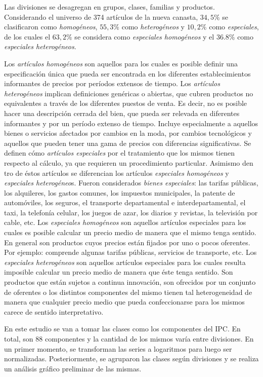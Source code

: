 \documentclass[12pt]{article}
\begin{document}
Las divisiones se desagregan en grupos, clases, familias y productos. Considerando el universo de 374 artículos de la nueva canasta, $34,5\%$ se clasificaron como \textit{homogéneos}, $55,3\%$ como \textit{heterogéneos} y $10,2\%$ como \textit{especiales}, de los cuales el $63,2\%$ se considera como \textit{especiales homogéneos} y el $36.8\%$ como \textit{especiales heterogéneos}.

Los \textit{artículos homogéneos} son aquellos para los cuales es posible definir una especificación única que pueda ser encontrada en los diferentes establecimientos informantes de precios por períodos extensos de tiempo. Los \textit{artículos heterogéneos} implican definiciones genéricas o abiertas, que cubren productos no equivalentes a través de los diferentes puestos de venta. Es decir, no es posible hacer una descripción cerrada del bien, que pueda ser relevada en diferentes informantes y por un período
extenso de tiempo. Incluye especialmente a aquellos bienes o servicios afectados por cambios en
la moda, por cambios tecnológicos y aquellos que pueden tener una gama de precios con
diferencias significativas.
Se definen cómo \textit{artículos especiales} por el tratamiento que los mismos tienen respecto al
cálculo, ya que requieren un procedimiento particular. Asimismo den
tro de éstos artículos se
diferencian los artículos \textit{especiales homogéneos} y \textit{especiales heterogéneo}s. Fueron considerados
\textit{bienes especiales}: las tarifas públicas, los alquileres, los gastos comunes, los impuestos
municipales, la patente de automóviles, los seguros, el transporte departamental e
interdepartamental, el taxi, la telefonía celular, los juegos de azar, los diarios y revistas, la
televisión por cable, etc.
Los \textit{especiales homogéneos} son aquellos artículos especiales para los cuales es posible
calcular un precio medio de manera que el mismo tenga sentido. En general son productos cuyos
precios están fijados por uno o pocos oferentes. Por ejemplo: comprende algunas tarifas públicas,
servicios de transporte, etc.
Los \textit{especiales heterogéneos} son aquellos artículos especiales para los cuales resulta imposible
calcular un precio medio de manera que éste tenga sentido. Son productos que están sujetos a
continua innovación, son ofrecidos por un conjunto de oferentes o los distintos componentes del
mismo tienen tal heterogeneidad de manera que cualquier precio medio que pueda
confeccionarse para los mismos carece de sentido interpretativo.

En este estudio se van a tomar las clases como los componentes del IPC. En total,  son 88 componentes y la cantidad de los mismos varía entre divisiones. 
En un primer momento, se transforman las series a logaritmos para luego ser normalizadas. Posteriormente, se agruparon las clases según divisiones y se realiza un análisis gráfico preliminar de las mismas.
\end{document}
